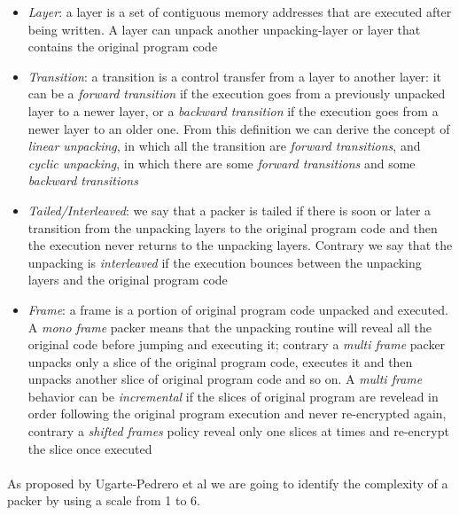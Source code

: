 \begin{itemize}
\item \textit{Layer}: a layer is a set of contiguous memory addresses that are executed after being written. A layer can unpack another unpacking-layer or layer that contains the original program code
\item \textit{Transition}: a transition is a control transfer from a layer to another layer: it can be a \textit{forward transition} if the execution goes from a previously unpacked layer to a newer layer, or a \textit{backward transition} if the execution goes from a newer layer to an older one. From this definition we can derive the concept of \textit{linear unpacking}, in which all the transition are \textit{forward transitions}, and \textit{cyclic unpacking}, in which there are some \textit{forward transitions} and some \textit{backward transitions}
\item \textit{Tailed/Interleaved}: we say that a packer is tailed if there is soon or later a transition from the unpacking layers to the original program code and then the execution never returns to the unpacking layers. Contrary we say that the unpacking is \textit{interleaved} if the execution bounces between the unpacking layers and the original program code
\item \textit{Frame}: a frame is a portion of original program code unpacked and executed. A \textit{mono frame} packer means that the unpacking routine will reveal all the original code before jumping and executing it; contrary a \textit{multi frame} packer unpacks only a slice of the original program code, executes it and then unpacks another slice of original program code and so on. A \textit{multi frame} behavior can be \textit{incremental} if the slices of original program are revelead in order following the original program execution and never re-encrypted again, contrary a \textit{shifted frames} policy reveal only one slices at times and re-encrypt the slice once executed
\end{itemize}
\paragraph{}
As proposed by Ugarte-Pedrero et al\cite{sokpacker} we are going to identify the complexity of a packer by using a scale from 1 to 6.

